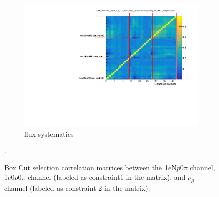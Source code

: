 \documentclass[a4paper]{article}
\newcommand{\npsel}{1$e$N$p$0$\pi$\xspace}
\newcommand{\zpsel}{1$e$0$p$0$\pi$\xspace}
\begin{document}
\begin{figure}[ht]
\begin{center}
\begin{subfigure}[b]{0.45\textwidth}
    \includegraphics[width=1.00\textwidth]{Sensitivity/CorrelationMatrices/SBNfit_correlation_matrix_nue_1e0p_numu_reco_e_H0_newboxcut_fluxonly_noCCMEC_withpoiserr_mc_withpoiserr_collapsed.pdf}
    \caption{flux systematics}
    \end{subfigure}
    \caption{\label{fig:boxcut_corr_matrix} Box Cut selection correlation matrices between the \npsel channel, \zpsel channel (labeled as constraint1 in the matrix), and $\nu_\mu$ channel (labeled as constraint 2 in the matrix). }.
\end{center}
\end{figure}
\end{document}
